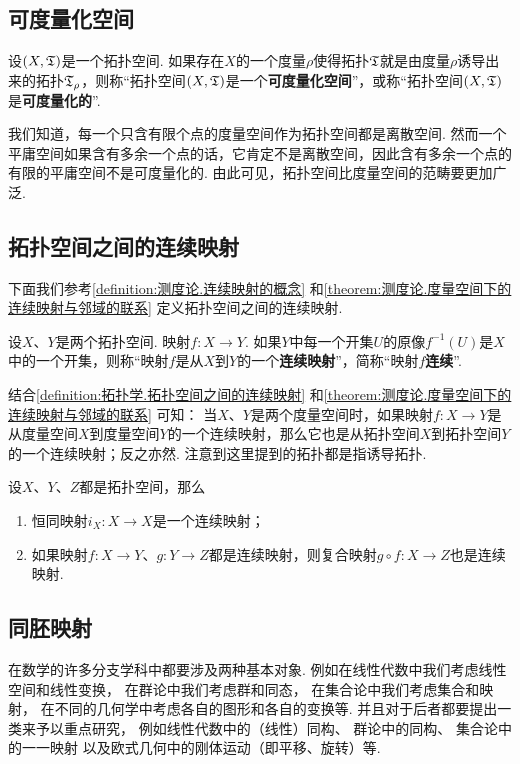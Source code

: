 \subsection{可度量化空间}
\begin{definition}
设\((X,\mathfrak T)\)是一个拓扑空间.
如果存在\(X\)的一个度量\(\rho\)使得拓扑\(\mathfrak T\)就是由度量\(\rho\)诱导出来的拓扑\(\mathfrak T_\rho\)，则称“拓扑空间\((X,\mathfrak T)\)是一个\textbf{可度量化空间}”，或称“拓扑空间\((X,\mathfrak T)\)是\textbf{可度量化的}”.
\end{definition}
我们知道，每一个只含有限个点的度量空间作为拓扑空间都是离散空间.
然而一个平庸空间如果含有多余一个点的话，它肯定不是离散空间，因此含有多余一个点的有限的平庸空间不是可度量化的.
由此可见，拓扑空间比度量空间的范畴要更加广泛.

\subsection{拓扑空间之间的连续映射}
下面我们参考\cref{definition:测度论.连续映射的概念} 和\cref{theorem:测度论.度量空间下的连续映射与邻域的联系} 定义拓扑空间之间的连续映射.
\begin{definition}\label{definition:拓扑学.拓扑空间之间的连续映射}
设\(X\)、\(Y\)是两个拓扑空间.
映射\(f\colon X \to Y\).
如果\(Y\)中每一个开集\(U\)的原像\(f^{-1}(U)\)是\(X\)中的一个开集，则称“映射\(f\)是从\(X\)到\(Y\)的一个\textbf{连续映射}”，简称“映射\(f\)\textbf{连续}”.
\end{definition}
结合\cref{definition:拓扑学.拓扑空间之间的连续映射} 和\cref{theorem:测度论.度量空间下的连续映射与邻域的联系} 可知：
当\(X\)、\(Y\)是两个度量空间时，如果映射\(f\colon X \to Y\)是从度量空间\(X\)到度量空间\(Y\)的一个连续映射，那么它也是从拓扑空间\(X\)到拓扑空间\(Y\)的一个连续映射；反之亦然.
注意到这里提到的拓扑都是指诱导拓扑.

\begin{theorem}\label{theorem:拓扑学.拓扑空间之间的连续映射的性质}
设\(X\)、\(Y\)、\(Z\)都是拓扑空间，那么
\begin{enumerate}
\item 恒同映射\(i_X\colon X \to X\)是一个连续映射；
\item 如果映射\(f\colon X \to Y\)、\(g\colon Y \to Z\)都是连续映射，则复合映射\(g \circ f\colon X \to Z\)也是连续映射.
\end{enumerate}
\end{theorem}

\subsection{同胚映射}
在数学的许多分支学科中都要涉及两种基本对象.
例如在线性代数中我们考虑线性空间和线性变换，%
在群论中我们考虑群和同态，%
在集合论中我们考虑集合和映射，%
在不同的几何学中考虑各自的图形和各自的变换等.
并且对于后者都要提出一类来予以重点研究，%
例如线性代数中的（线性）同构、%
群论中的同构、%
集合论中的一一映射%
以及欧式几何中的刚体运动（即平移、旋转）等.

